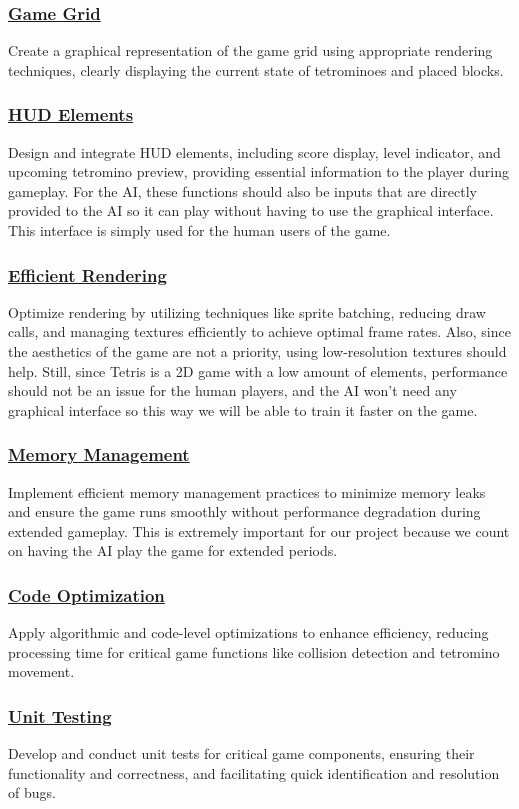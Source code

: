 \documentclass[conference]{IEEEtran}
\begin{document}
\subsubsection{\underline{Game Grid}}
Create a graphical representation of the game grid using appropriate rendering techniques, clearly displaying the current state of tetrominoes and placed blocks.
\subsubsection{\underline{HUD Elements}}
Design and integrate HUD elements, including score display, level indicator, and upcoming tetromino preview, providing essential information to the player during gameplay. For the AI, these functions should also be inputs that are directly provided to the AI so it can play without having to use the graphical interface. This interface is simply used for the human users of the game.
\subsubsection{\underline{Efficient Rendering}}
Optimize rendering by utilizing techniques like sprite batching, reducing draw calls, and managing textures efficiently to achieve optimal frame rates. Also, since the aesthetics of the game are not a priority, using low-resolution textures should help. Still, since Tetris is a 2D game with a low amount of elements, performance should not be an issue for the human players, and the AI won’t need any graphical interface so this way we will be able to train it faster on the game.
\subsubsection{\underline{Memory Management}}
Implement efficient memory management practices to minimize memory leaks and ensure the game runs smoothly without performance degradation during extended gameplay. This is extremely important for our project because we count on having the AI play the game for extended periods.
\subsubsection{\underline{Code Optimization}}
Apply algorithmic and code-level optimizations to enhance efficiency, reducing processing time for critical game functions like collision detection and tetromino movement.
\subsubsection{\underline{Unit Testing}}
Develop and conduct unit tests for critical game components, ensuring their functionality and correctness, and facilitating quick identification and resolution of bugs.
\end{document}
